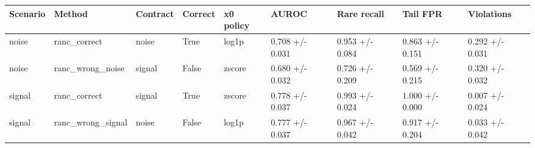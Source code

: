\begin{tabular}{lllllllll}
\toprule
Scenario & Method & Contract & Correct & x0 policy & AUROC & Rare recall & Tail FPR & Violations \\
\midrule
noise & ranc\_correct & noise & True & log1p & 0.708 +/- 0.031 & 0.953 +/- 0.084 & 0.863 +/- 0.151 & 0.292 +/- 0.031 \\
noise & ranc\_wrong\_noise & signal & False & zscore & 0.680 +/- 0.032 & 0.726 +/- 0.209 & 0.569 +/- 0.215 & 0.320 +/- 0.032 \\
signal & ranc\_correct & signal & True & zscore & 0.778 +/- 0.037 & 0.993 +/- 0.024 & 1.000 +/- 0.000 & 0.007 +/- 0.024 \\
signal & ranc\_wrong\_signal & noise & False & log1p & 0.777 +/- 0.037 & 0.967 +/- 0.042 & 0.917 +/- 0.204 & 0.033 +/- 0.042 \\
\bottomrule
\end{tabular}
